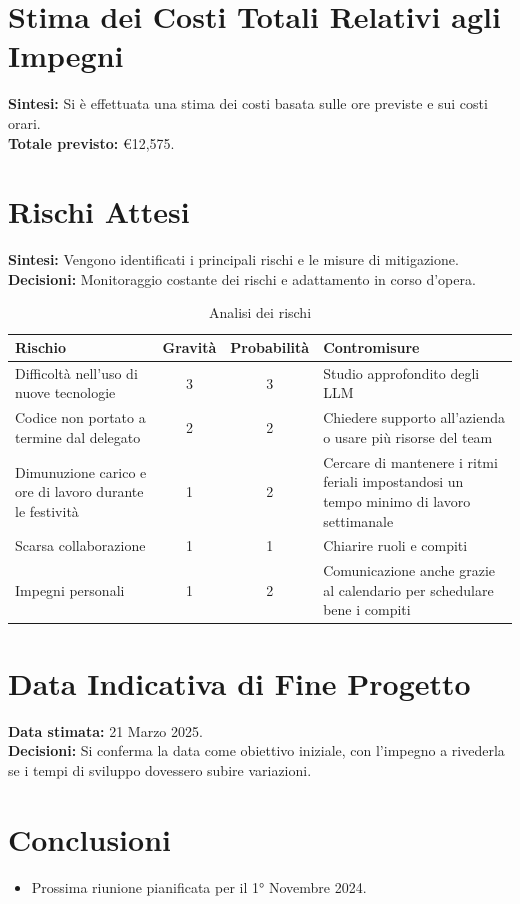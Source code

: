 \documentclass{article}
\begin{document}
\section{Stima dei Costi Totali Relativi agli Impegni}
\textbf{Sintesi:} Si è effettuata una stima dei costi basata sulle ore previste e sui costi orari. \\
\textbf{Totale previsto:} €12,575. 

\section{Rischi Attesi}

\textbf{Sintesi:} Vengono identificati i principali rischi e le misure di mitigazione.\\
\textbf{Decisioni:} Monitoraggio costante dei rischi e adattamento in corso d’opera.

\begin{table}[h]
\centering
\begin{tabularx}{\textwidth}{|X|c|c|X|}
    \hline
    \textbf{Rischio} & \textbf{Gravità} & \textbf{Probabilità}& \textbf{Contromisure}\\
    \hline
    Difficoltà nell'uso di nuove tecnologie & 3& 3 & Studio approfondito degli LLM \\ 
    \hline
    Codice non portato a termine dal delegato & 2 & 2 & Chiedere supporto all'azienda o usare più risorse del team\\ 
    \hline
    Dimunuzione carico e ore di lavoro durante le festività & 1 & 2 & Cercare di mantenere i ritmi feriali impostandosi un tempo minimo di lavoro settimanale\\ 
    \hline 
    Scarsa collaborazione & 1& 1 & Chiarire ruoli e compiti \\ 
    \hline
    Impegni personali & 1 & 2 & Comunicazione anche grazie al calendario per schedulare bene i compiti\\ 
    \hline 
\end{tabularx}
\caption{Analisi dei rischi}
\end{table}

\section{Data Indicativa di Fine Progetto}
\textbf{Data stimata:} 21 Marzo 2025. \\
\textbf{Decisioni:} Si conferma la data come obiettivo iniziale, con l’impegno a rivederla se i tempi di sviluppo dovessero subire variazioni.

\section*{Conclusioni}
\begin{itemize}
    \item Prossima riunione pianificata per il 1° Novembre 2024.
\end{itemize}
\end{document}
